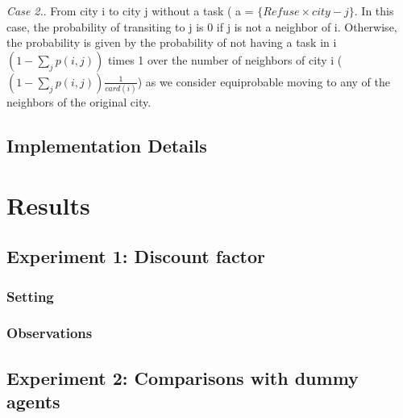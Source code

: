 \documentclass[11pt]{article}
\begin{document}
\textit{Case 2.}. From city i to city j without a task ( a = $\{Refuse \times city-j \}$. In this case, the probability of transiting to j is 0 if j is not a neighbor of i. Otherwise, the probability is given by the probability of not having a task in i $(1 - \sum_j p(i,j))$ times 1 over the number of neighbors of city i  ( $(1 - \sum_j p(i,j)) \frac{1}{card(i)}$) as we consider equiprobable moving to any of the neighbors of the original city.   

\subsection{Implementation Details}

\section{Results}

\subsection{Experiment 1: Discount factor}

\subsubsection{Setting}

\subsubsection{Observations}

\subsection{Experiment 2: Comparisons with dummy agents}
\end{document}
